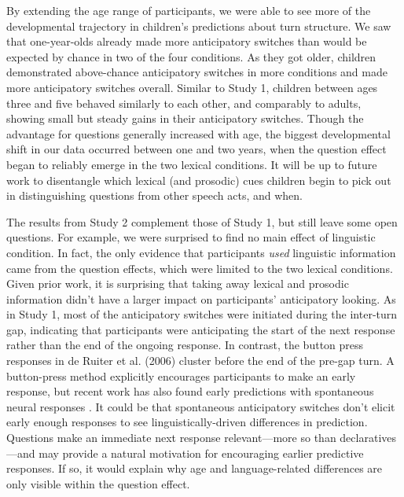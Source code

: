 \documentclass[authoryear, 12pt]{elsarticle}
\begin{document}
By extending the age range of participants, we were able to see more of the developmental trajectory in children's predictions about turn structure. We saw that one-year-olds already made more anticipatory switches than would be expected by chance in two of the four conditions. As they got older, children demonstrated above-chance anticipatory switches in more conditions and made more anticipatory switches overall. Similar to Study 1, children between ages three and five behaved similarly to each other, and comparably to adults, showing small but steady gains in their anticipatory switches. Though the advantage for questions generally increased with age, the biggest developmental shift in our data occurred between one and two years, when the question effect began to reliably emerge in the two lexical conditions. It will be up to future work to disentangle which lexical (and prosodic) cues children begin to pick out in distinguishing questions from other speech acts, and when.

The results from Study 2 complement those of Study 1, but still leave some open questions. For example, we were surprised to find no main effect of linguistic condition. In fact, the only evidence that participants  \textit{used} linguistic information came from the question effects, which were limited to the two lexical conditions. Given prior work, it is surprising that taking away lexical and prosodic information didn't have a larger impact on participants' anticipatory looking. As in Study 1, most of the anticipatory switches were initiated during the inter-turn gap, indicating that participants were anticipating the start of the next response rather than the end of the ongoing response. In contrast, the button press responses in de Ruiter et al. (2006) cluster before the end of the pre-gap turn. A button-press method explicitly encourages participants to make an early response, but recent work has also found early predictions with spontaneous neural responses \citep{bogelsmagyariInPrep, gisladottirUndRev, magyariUndRev}. It could be that spontaneous anticipatory switches don't elicit early enough responses to see linguistically-driven differences in prediction. Questions make an immediate next response relevant---more so than declaratives---and may provide a natural motivation for encouraging earlier predictive responses. If so, it would explain why age and language-related differences are only visible within the question effect.
\end{document}
